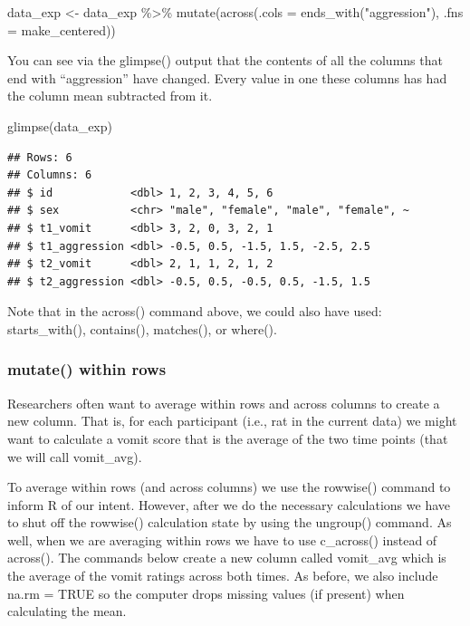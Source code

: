 \documentclass[
]{krantz}
\makeatletter
\newenvironment{Shaded}{\begin{snugshade}}{\end{snugshade}}
\newcommand{\AttributeTok}[1]{\textcolor[rgb]{0.61,0.61,0.61}{#1}}
\newcommand{\FunctionTok}[1]{\textcolor[rgb]{0,0,0}{#1}}
\newcommand{\NormalTok}[1]{#1}
\newcommand{\OtherTok}[1]{\textcolor[rgb]{0.37,0.37,0.37}{#1}}
\newcommand{\SpecialCharTok}[1]{\textcolor[rgb]{0,0,0}{#1}}
\newcommand{\StringTok}[1]{\textcolor[rgb]{0.5,0.5,0.5}{#1}}
\newenvironment{kframe}{%
\medskip{}
\setlength{\fboxsep}{.8em}
 \def\at@end@of@kframe{}%
 \ifinner\ifhmode%
  \def\at@end@of@kframe{\end{minipage}}%
  \begin{minipage}{\columnwidth}%
 \fi\fi%
 \def\FrameCommand##1{\hskip\@totalleftmargin \hskip-\fboxsep
 \colorbox{shadecolor}{##1}\hskip-\fboxsep
     \hskip-\linewidth \hskip-\@totalleftmargin \hskip\columnwidth}%
 \MakeFramed {\advance\hsize-\width
   \@totalleftmargin\z@ \linewidth\hsize
   \@setminipage}}%
 {\par\unskip\endMakeFramed%
 \at@end@of@kframe}
\renewenvironment{Shaded}{\begin{kframe}}{\end{kframe}}
\makeatother
\begin{document}
\begin{Shaded}
\begin{Highlighting}[]
\NormalTok{data\_exp }\OtherTok{\textless{}{-}}\NormalTok{ data\_exp }\SpecialCharTok{\%\textgreater{}\%} 
  \FunctionTok{mutate}\NormalTok{(}\FunctionTok{across}\NormalTok{(}\AttributeTok{.cols =} \FunctionTok{ends\_with}\NormalTok{(}\StringTok{"aggression"}\NormalTok{), }
                \AttributeTok{.fns =}\NormalTok{ make\_centered))}
\end{Highlighting}
\end{Shaded}

You can see via the glimpse() output that the contents of all the columns that end with ``aggression'' have changed. Every value in one these columns has had the column mean subtracted from it.

\begin{Shaded}
\begin{Highlighting}[]
\FunctionTok{glimpse}\NormalTok{(data\_exp)}
\end{Highlighting}
\end{Shaded}

\begin{verbatim}
## Rows: 6
## Columns: 6
## $ id            <dbl> 1, 2, 3, 4, 5, 6
## $ sex           <chr> "male", "female", "male", "female", ~
## $ t1_vomit      <dbl> 3, 2, 0, 3, 2, 1
## $ t1_aggression <dbl> -0.5, 0.5, -1.5, 1.5, -2.5, 2.5
## $ t2_vomit      <dbl> 2, 1, 1, 2, 1, 2
## $ t2_aggression <dbl> -0.5, 0.5, -0.5, 0.5, -1.5, 1.5
\end{verbatim}

Note that in the across() command above, we could also have used: starts\_with(), contains(), matches(), or where().

\hypertarget{mutate-within-rows}{%
\subsubsection{mutate() within rows}\label{mutate-within-rows}}

Researchers often want to average within rows and across columns to create a new column. That is, for each participant (i.e., rat in the current data) we might want to calculate a vomit score that is the average of the two time points (that we will call vomit\_avg).

To average within rows (and across columns) we use the rowwise() command to inform R of our intent. However, after we do the necessary calculations we have to shut off the rowwise() calculation state by using the ungroup() command. As well, when we are averaging within rows we have to use c\_across() instead of across(). The commands below create a new column called vomit\_avg which is the average of the vomit ratings across both times. As before, we also include na.rm = TRUE so the computer drops missing values (if present) when calculating the mean.
\end{document}
